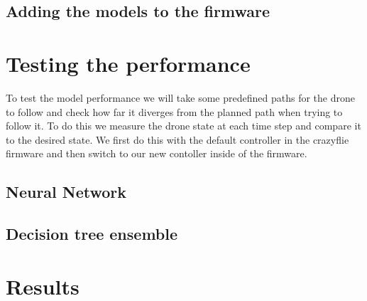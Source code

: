 \documentclass[11pt]{article}
\begin{document}
\subsection{Adding the models to the firmware}

\section{Testing the performance}
To test the model performance we will take some predefined paths for the drone to follow and check how far it diverges from the planned path when trying to follow it. To do this we measure the drone state at each time step and compare it to the desired state. We first do this with the default controller in the crazyflie firmware and then switch to our new contoller inside of the firmware.

\subsection{Neural Network}

\subsection{Decision tree ensemble}

\section{Results}
\end{document}
